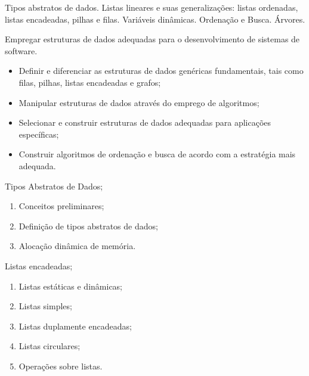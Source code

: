 \begin{pud}
	
	
	\ementa
	Tipos abstratos de dados. Listas lineares e suas generalizações: listas ordenadas, listas encadeadas, pilhas e filas. Variáveis dinâmicas. Ordenação e Busca. Árvores.
	
	\objetivo
	Empregar estruturas de dados adequadas para o desenvolvimento de sistemas de software.
	\begin{itemize}
	  \item Definir e diferenciar as estruturas de dados genéricas fundamentais, tais como filas, pilhas, listas encadeadas e grafos;
	  \item Manipular estruturas de dados através do emprego de algoritmos;
	  \item Selecionar e construir estruturas de dados adequadas para aplicações específicas;
	  \item Construir algoritmos de ordenação e busca de acordo com a estratégia mais adequada.
	\end{itemize}
	
	
	\programa
	
	\begin{description}[itemsep=0em]
		\item[UNIDADE I:] Tipos Abstratos de Dados; 
         \begin{enumerate}[itemsep=0em, topsep=0em]
           \item Conceitos preliminares;
           \item Definição de tipos abstratos de dados;
           \item Alocação dinâmica de memória.
         \end{enumerate}
         
         \item[UNIDADE II:] Listas encadeadas; 
         \begin{enumerate}[itemsep=0em, topsep=0em]
           \item Listas estáticas e dinâmicas;
           \item Listas simples;
           \item Listas duplamente encadeadas; 
           \item Listas circulares;
           \item Operações sobre listas.
         \end{enumerate}
         

\end{description}
\end{pud}
